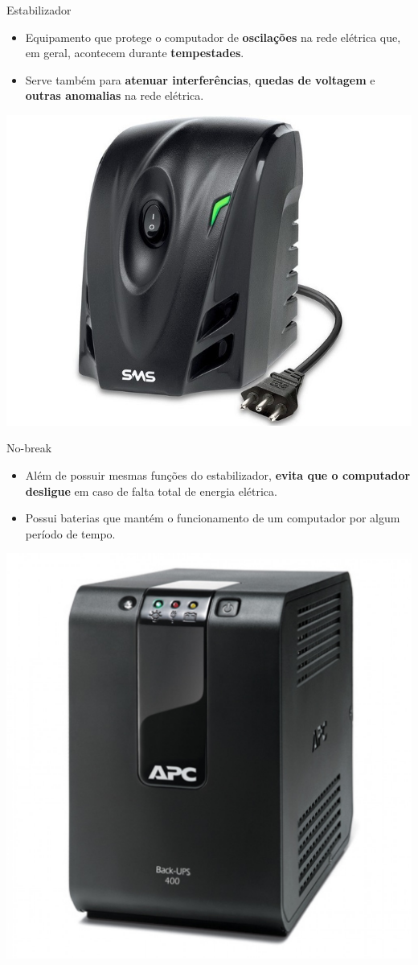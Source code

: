 \begin{frame}{Estabilizador}
	\begin{block}{}
		\begin{itemize}
			\item Equipamento que protege o computador de \textbf{oscilações} na rede elétrica que, em geral, acontecem durante \textbf{tempestades}.
			\item Serve também para \textbf{atenuar interferências}, \textbf{quedas de voltagem} e \textbf{outras anomalias} na rede elétrica.
		\end{itemize}
	\end{block}

	\medskip

	\centering
	\includegraphics[width=0.55\linewidth]{Figuras/Ch02/fig10}
\end{frame}


\begin{frame}{No-break}
	\begin{block}{}
		\begin{itemize}
			\item Além de possuir mesmas funções do estabilizador, \textbf{evita que o computador desligue} em caso de falta total de energia elétrica.
			\item Possui baterias que mantém o funcionamento de um computador por algum período de tempo.
		\end{itemize}
	\end{block}

	\centering
	\includegraphics[width=0.45\linewidth]{Figuras/Ch02/fig11}
\end{frame}


